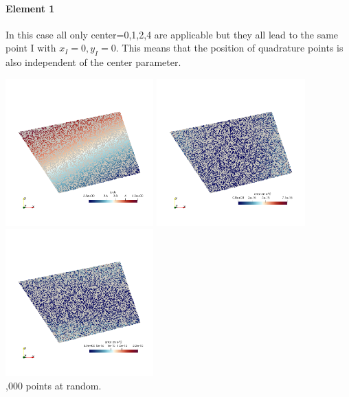 \paragraph{Element 1}

In this case all only {\python center=0,1,2,4} are applicable but they all 
lead to the same point I with $x_I=0,y_I=0$. This means that the position of 
quadrature points is also independent of the {\python center} parameter.
 
\begin{center}
\includegraphics[width=5.7cm]{images/mappings/biquadratic3/elt1/jcob}
\includegraphics[width=5.7cm]{images/mappings/biquadratic3/elt1/error_posx2}
\includegraphics[width=5.7cm]{images/mappings/biquadratic3/elt1/error_posy2}\\
{,000 points at random.} 
\end{center}


